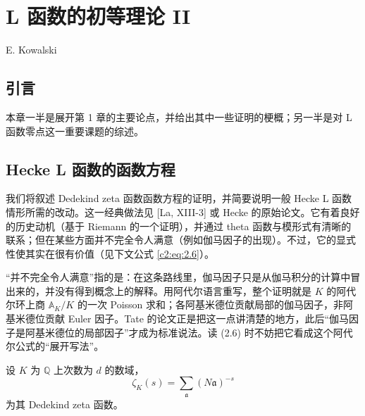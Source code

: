 \chapter{L 函数的初等理论 II}\label{ch:02}

\begin{center}
E. Kowalski
\end{center}

\section{引言}\label{c2:sec:1}

本章一半是展开第 1 章的主要论点，并给出其中一些证明的梗概；另一半是对 L 函数零点这一重要课题的综述。

\section{Hecke L 函数的函数方程}\label{c2:sec:2}

我们将叙述 Dedekind zeta 函数函数方程的证明，并简要说明一般 Hecke L 函数情形所需的改动。这一经典做法见 [La, XIII-3] 或 Hecke 的原始论文。它有着良好的历史动机（基于 Riemann 的一个证明），并通过 theta 函数与模形式有清晰的联系；但在某些方面并不完全令人满意（例如伽马因子的出现）。不过，它的显式性使其实在很有价值（见下文公式 \eqref{c2:eq:2.6}）。

\begin{annote}
“并不完全令人满意”指的是：在这条路线里，伽马因子只是从伽马积分的计算中冒出来的，并没有得到概念上的解释。用阿代尔语言重写，整个证明就是 $K$ 的阿代尔环上商 $\mathbb{A}_K/K$ 的一次 Poisson 求和；各阿基米德位贡献局部的伽马因子，非阿基米德位贡献 Euler 因子。Tate 的论文正是把这一点讲清楚的地方，此后“伽马因子是阿基米德位的局部因子”才成为标准说法。读 (2.6) 时不妨把它看成这个阿代尔公式的“展开写法”。
\par\vspace{0.15em}{\raggedleft 【来源：Tate《Fourier analysis in number fields and Hecke's zeta-functions》（A）；Lang《Algebraic Number Theory》Ch.~XIII（A）；nLab “Poisson summation formula” 条目（B，与 A 交叉）】\par}
\end{annote}

设 $K$ 为 $\mathbb{Q}$ 上次数为 $d$ 的数域，
\begin{equation}\tag{2.1}\label{c2:eq:2.1}
\zeta_K(s)=\sum_{\mathfrak{a}}(N\mathfrak{a})^{-s}
\end{equation}
为其 Dedekind zeta 函数。

